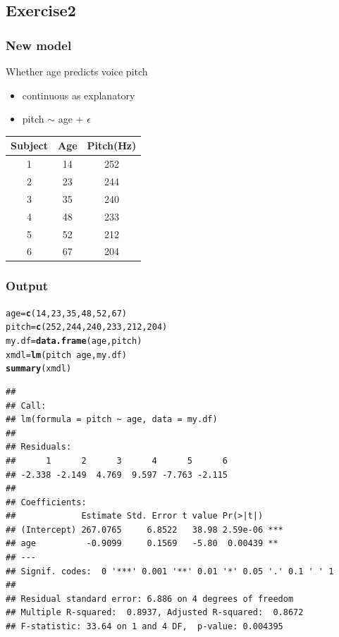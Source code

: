 \documentclass[10p]{beamer}\usepackage[]{graphicx}\usepackage[]{color}
\makeatletter
\newcommand{\hlnum}[1]{\textcolor[rgb]{0.686,0.059,0.569}{#1}}%
\newcommand{\hlopt}[1]{\textcolor[rgb]{0,0,0}{#1}}%
\newcommand{\hlstd}[1]{\textcolor[rgb]{0.345,0.345,0.345}{#1}}%
\newcommand{\hlkwb}[1]{\textcolor[rgb]{0.69,0.353,0.396}{#1}}%
\newcommand{\hlkwd}[1]{\textcolor[rgb]{0.737,0.353,0.396}{\textbf{#1}}}%
\newenvironment{kframe}{%
 \def\at@end@of@kframe{}%
 \ifinner\ifhmode%
  \def\at@end@of@kframe{\end{minipage}}%
  \begin{minipage}{\columnwidth}%
 \fi\fi%
 \def\FrameCommand##1{\hskip\@totalleftmargin \hskip-\fboxsep
 \colorbox{shadecolor}{##1}\hskip-\fboxsep
     \hskip-\linewidth \hskip-\@totalleftmargin \hskip\columnwidth}%
 \MakeFramed {\advance\hsize-\width
   \@totalleftmargin\z@ \linewidth\hsize
   \@setminipage}}%
 {\par\unskip\endMakeFramed%
 \at@end@of@kframe}
\newenvironment{knitrout}{}{} %
\makeatother
\begin{document}
\subsection[Ex2]{Exercise2}

\begin{frame}[fragile]
\frametitle{New model}
Whether age predicts voice pitch
\begin{itemize}
\item continuous as explanatory 
\item pitch $\sim$ age + $\epsilon$
\end{itemize}
\begin{center}
\begin{tabular}{ccc}
\toprule
Subject & Age & Pitch(Hz) \\
\midrule
1 & 14 & 252 \\
2 & 23 & 244 \\
3 & 35 & 240 \\
4 & 48 & 233 \\
5 & 52 & 212 \\
6 & 67 & 204 \\
\bottomrule
\end{tabular}
\end{center}
\end{frame}

\begin{frame}[fragile]
\frametitle{Output}
\begin{knitrout}\tiny
{}\color{fgcolor}\begin{kframe}
\begin{alltt}
\hlstd{age} \hlkwb{=} \hlkwd{c}\hlstd{(}\hlnum{14}\hlstd{,}\hlnum{23}\hlstd{,}\hlnum{35}\hlstd{,}\hlnum{48}\hlstd{,}\hlnum{52}\hlstd{,}\hlnum{67}\hlstd{)}
\hlstd{pitch} \hlkwb{=} \hlkwd{c}\hlstd{(}\hlnum{252}\hlstd{,}\hlnum{244}\hlstd{,}\hlnum{240}\hlstd{,}\hlnum{233}\hlstd{,}\hlnum{212}\hlstd{,}\hlnum{204}\hlstd{)}
\hlstd{my.df} \hlkwb{=} \hlkwd{data.frame}\hlstd{(age, pitch)}
\hlstd{xmdl} \hlkwb{=} \hlkwd{lm}\hlstd{(pitch}\hlopt{~}\hlstd{age, my.df)}
\hlkwd{summary}\hlstd{(xmdl)}
\end{alltt}
\begin{verbatim}
## 
## Call:
## lm(formula = pitch ~ age, data = my.df)
## 
## Residuals:
##      1      2      3      4      5      6 
## -2.338 -2.149  4.769  9.597 -7.763 -2.115 
## 
## Coefficients:
##             Estimate Std. Error t value Pr(>|t|)    
## (Intercept) 267.0765     6.8522   38.98 2.59e-06 ***
## age          -0.9099     0.1569   -5.80  0.00439 ** 
## ---
## Signif. codes:  0 '***' 0.001 '**' 0.01 '*' 0.05 '.' 0.1 ' ' 1
## 
## Residual standard error: 6.886 on 4 degrees of freedom
## Multiple R-squared:  0.8937,	Adjusted R-squared:  0.8672 
## F-statistic: 33.64 on 1 and 4 DF,  p-value: 0.004395
\end{verbatim}
\end{kframe}
\end{knitrout}
\end{frame}
\end{document}
